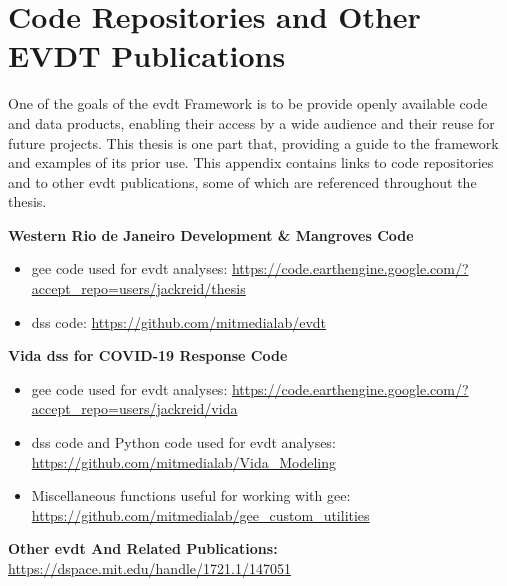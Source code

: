 \chapter{Code Repositories and Other EVDT Publications} \label{app:code}

One of the goals of the \ac{evdt} Framework is to be provide openly available code and data products, enabling their access by a wide audience and their reuse for future projects. This thesis is one part that, providing a guide to the framework and examples of its prior use. This appendix contains links to code repositories and to other \ac{evdt} publications, some of which are referenced throughout the thesis.

\textbf{Western Rio de Janeiro Development \& Mangroves Code}

\begin{itemize}[itemsep=0pt,parsep=0pt]
	\item{\ac{gee} code used for \ac{evdt} analyses: \url{https://code.earthengine.google.com/?accept_repo=users/jackreid/thesis}}
	\item{\ac{dss} code: \url{https://github.com/mitmedialab/evdt}}
\end{itemize}


\textbf{Vida \ac{dss} for COVID-19 Response Code}

\begin{itemize}[itemsep=0pt,parsep=0pt]
	\item{\ac{gee} code used for \ac{evdt} analyses: \url{https://code.earthengine.google.com/?accept_repo=users/jackreid/vida}}
	\item{\ac{dss} code and Python code used for \ac{evdt} analyses: \url{https://github.com/mitmedialab/Vida_Modeling}}
	\item{Miscellaneous functions useful for working with \ac{gee}: \url{https://github.com/mitmedialab/gee_custom_utilities}}
\end{itemize}

\textbf{Other \ac{evdt} And Related Publications:} \url{https://dspace.mit.edu/handle/1721.1/147051}
